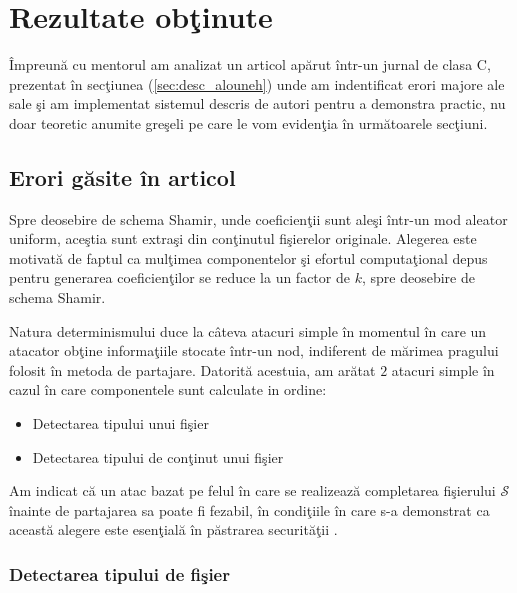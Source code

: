 \documentclass{llncs}
\begin{document}
\section{Rezultate ob\c{t}inute}
\^{I}mpreun\u{a} cu mentorul am analizat un articol ap\u{a}rut \^{i}ntr-un jurnal de clasa C, prezentat \^{i}n sec\c{t}iunea (\ref{sec:desc_alouneh}) unde am indentificat erori majore ale sale \c{s}i am implementat sistemul descris de autori pentru a demonstra practic, nu doar teoretic anumite gre\c{s}eli pe care le vom eviden\c{t}ia \^{i}n urm\u{a}toarele sec\c{t}iuni. \cite{AAMK:2013}

\label{sec:results}
\subsection{Erori g\u{a}site \^{i}n articol}

Spre deosebire de schema Shamir, unde coeficien\c{t}ii sunt ale\c{s}i \^{i}ntr-un mod aleator uniform, ace\c{s}tia sunt extra\c{s}i din con\c{t}inutul fi\c{s}ierelor originale.
Alegerea este motivat\u{a} de faptul ca mul\c{t}imea componentelor \c{s}i efortul computa\c{t}ional depus pentru generarea coeficien\c{t}ilor se reduce la un factor de $k$, spre deosebire de schema Shamir.

Natura determinismului duce la c\^{a}teva atacuri simple \^{i}n momentul \^{i}n care un atacator ob\c{t}ine informa\c{t}iile stocate \^{i}ntr-un nod, indiferent de m\u{a}rimea pragului folosit \^{i}n metoda de partajare. Datorit\u{a} acestuia, am ar\u{a}tat $2$ atacuri simple \^{i}n cazul \^{i}n care componentele sunt calculate in ordine:
\begin{itemize}
	\item Detectarea tipului unui fi\c{s}ier
	\item Detectarea tipului de con\c{t}inut unui fi\c{s}ier
\end{itemize}

Am indicat c\u{a} un atac bazat pe felul \^{i}n care se realizeaz\u{a} completarea fi\c{s}ierului $\mathcal{S}$ \^{i}nainte de partajarea sa poate fi fezabil, \^{i}n condi\c{t}iile \^{i}n care s-a demonstrat ca aceast\u{a} alegere este esen\c{t}ial\u{a} \^{i}n p\u{a}strarea securit\u{a}\c{t}ii \cite{Vaudenay:2002}.

\subsubsection{Detectarea tipului de fi\c{s}ier}\hspace*{\fill} \\
\label{subsec:file_type_detection}
\end{document}
